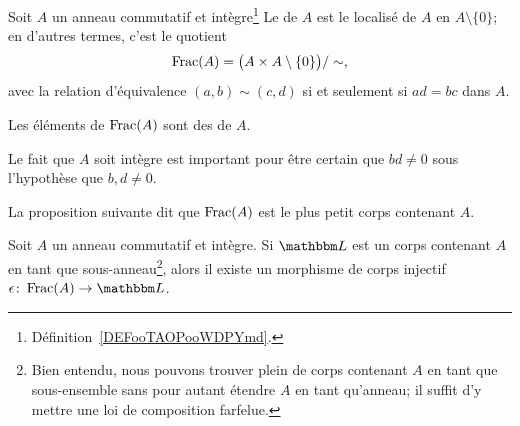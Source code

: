 \begin{definition}       \label{DEFooGJYXooOiJQvP}
    Soit \( A \) un anneau commutatif et intègre\footnote{Définition~\ref{DEFooTAOPooWDPYmd}.} Le  de \( A\) est le localisé de \( A \) en \( A \setminus \{ 0 \} \); en d'autres termes, c'est le quotient
    \begin{equation}
        \operatorname{Frac}(A)=\big( A\times A\setminus\{ 0 \} \big)/\sim,
    \end{equation}
    avec la relation d'équivalence  \( (a,b)\sim(c,d)\) si et seulement si \( ad=bc\) dans \( A \).

    Les éléments de \( \operatorname{Frac}(A)\) sont des  de \( A\).
\end{definition}
Le fait que \( A\) soit intègre est important pour être certain que \( bd\neq 0\) sous l'hypothèse que \( b,d\neq 0\).

La proposition suivante dit que \( \operatorname{Frac}(A)\) est le plus petit corps contenant \( A\).

\begin{proposition}      \label{PROPooGSHDooJOnDsp}
    Soit \( A \) un anneau commutatif et intègre. Si \( \eL\) est un corps contenant \( A\) en tant que sous-anneau\footnote{Bien entendu, nous pouvons trouver plein de corps contenant \( A\) en tant que sous-ensemble sans pour autant étendre \( A\) en tant qu'anneau; il suffit d'y mettre une loi de composition farfelue.}, alors il existe un morphisme de corps injectif \( \epsilon\colon \Frac(A)\to \eL\).
\end{proposition}

